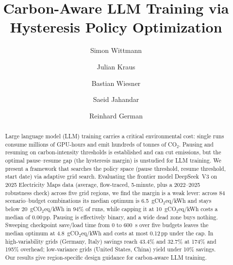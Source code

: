 \documentclass[runningheads]{llncs}
\begin{document}
\title{Carbon-Aware LLM Training via\\Hysteresis Policy Optimization}

\author{Simon Wittmann \and Julian
  Kraus \and Bastian
  Wiesner \and Saeid
  Jahandar \and Reinhard
German}



\maketitle

\begin{abstract}

  Large language model (LLM) training carries a critical
  environmental cost: single runs consume millions of GPU-hours and
  emit hundreds of tonnes of CO$_2$. Pausing and resuming on
  carbon-intensity thresholds is established and can cut emissions,
  but the optimal pause--resume gap (the hysteresis margin) is
  unstudied for LLM training. We present a framework that searches
  the policy space (pause threshold, resume threshold, start date)
  via adaptive grid search. Evaluating the frontier model DeepSeek~V3
  on 2025 Electricity Maps data (average, flow-traced, 5-minute, plus
  a 2022--2025 robustness check) across five grid regions, we find
  the margin is a weak lever: across 84 scenario--budget combinations
  its median optimum is 6.5~gCO$_2$eq/kWh and stays below
  20~gCO$_2$eq/kWh in 94\% of runs, while capping it at
  10~gCO$_2$eq/kWh costs a median of 0.00\,pp. Pausing is effectively
  binary, and a wide dead zone buys nothing. Sweeping checkpoint
  save/load time from 0 to 600~s over five budgets leaves the median
  optimum at 4.8~gCO$_2$eq/kWh and costs at most 0.12\,pp under the cap. In
  high-variability grids (Germany, Italy) savings reach 43.4\% and
  32.7\% at 174\% and 195\% overhead; low-variance grids (United
  States, China) yield under 10\% savings. Our results give
  region-specific design guidance for carbon-aware LLM training.

\end{abstract}
\end{document}
